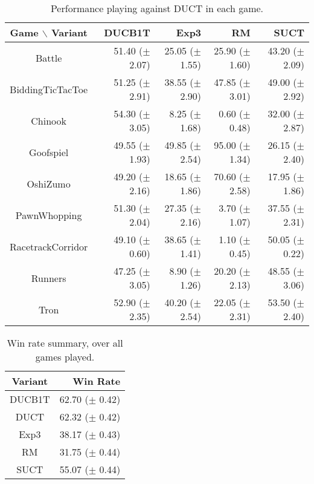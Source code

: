 \documentclass{article}
\begin{document}
\begin{table}
\begin{center}
\begin{tabular}{|c|rrrr|}
\hline
 Game $\backslash$ Variant    & DUCB1T &  Exp3		 & RM		 & SUCT		\\ 
\hline
                   Battle     & 51.40 ($\pm$ 2.07)	& 25.05 ($\pm$ 1.55)	& 25.90 ($\pm$ 1.60)	& 43.20 ($\pm$ 2.09)	\\ 
         BiddingTicTacToe     & 51.25 ($\pm$ 2.91)	& 38.55 ($\pm$ 2.90)	& 47.85 ($\pm$ 3.01)	& 49.00 ($\pm$ 2.92)	\\ 
                  Chinook     & 54.30 ($\pm$ 3.05)	& 8.25 ($\pm$ 1.68)	& 0.60 ($\pm$ 0.48)	& 32.00 ($\pm$ 2.87)	\\ 
                Goofspiel     & 49.55 ($\pm$ 1.93)	& 49.85 ($\pm$ 2.54)	& 95.00 ($\pm$ 1.34)	& 26.15 ($\pm$ 2.40)	\\ 
                 OshiZumo     & 49.20 ($\pm$ 2.16)	& 18.65 ($\pm$ 1.86)	& 70.60 ($\pm$ 2.58)	& 17.95 ($\pm$ 1.86)	\\ 
             PawnWhopping     & 51.30 ($\pm$ 2.04)	& 27.35 ($\pm$ 2.16)	& 3.70 ($\pm$ 1.07)	& 37.55 ($\pm$ 2.31)	\\ 
        RacetrackCorridor     & 49.10 ($\pm$ 0.60)	& 38.65 ($\pm$ 1.41)	& 1.10 ($\pm$ 0.45)	& 50.05 ($\pm$ 0.22)	\\ 
                  Runners     & 47.25 ($\pm$ 3.05)	& 8.90 ($\pm$ 1.26)	& 20.20 ($\pm$ 2.13)	& 48.55 ($\pm$ 3.06)	\\ 
                     Tron     & 52.90 ($\pm$ 2.35)	& 40.20 ($\pm$ 2.54)	& 22.05 ($\pm$ 2.31)	& 53.50 ($\pm$ 2.40)	\\ 
\hline
\end{tabular}
\end{center}
\caption{Performance playing against DUCT in each game. \label{tbl:vsduct}}
\end{table}



\begin{table}
\begin{center}
\begin{tabular}{|c|r|}
\hline
Variant     & Win Rate \\
\hline
    DUCB1T  &   62.70 ($\pm$ 0.42) \\
      DUCT  &   62.32 ($\pm$ 0.42) \\
      Exp3  &   38.17 ($\pm$ 0.43) \\
        RM  &   31.75 ($\pm$ 0.44) \\
      SUCT  &   55.07 ($\pm$ 0.44) \\
\hline
\end{tabular}
\end{center}
\caption{Win rate summary, over all games played. \label{tbl:summary}}
\end{table}
\end{document}
